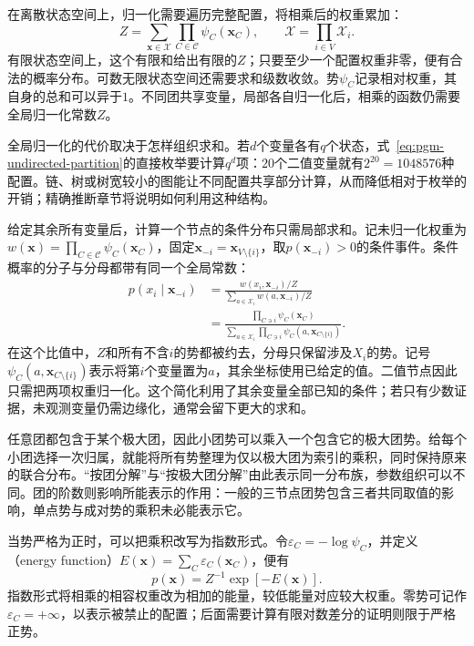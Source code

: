 在离散状态空间上，归一化需要遍历完整配置，将相乘后的权重累加：
\begin{equation}
  Z=\sum_{\bm{x}\in\mathcal{X}}\prod_{C\in\mathcal{C}}\psi_C(\bm{x}_C),
  \qquad
  \mathcal{X}=\prod_{i\in V}\mathcal{X}_i.
  \label{eq:pgm-undirected-partition}
\end{equation}
有限状态空间上，这个有限和给出有限的$Z$；只要至少一个配置权重非零，便有合法的概率分布。可数无限状态空间还需要求和级数收敛。势$\psi_C$记录相对权重，其自身的总和可以异于$1$。不同团共享变量，局部各自归一化后，相乘的函数仍需要全局归一化常数$Z$。

全局归一化的代价取决于怎样组织求和。若$d$个变量各有$q$个状态，式~\eqref{eq:pgm-undirected-partition}的直接枚举要计算$q^d$项：$20$个二值变量就有$2^{20}=1048576$种配置。链、树或树宽较小的图能让不同配置共享部分计算，从而降低相对于枚举的开销；精确推断章节将说明如何利用这种结构。

给定其余所有变量后，计算一个节点的条件分布只需局部求和。记未归一化权重为$w(\bm{x})=\prod_{C\in\mathcal C}\psi_C(\bm{x}_C)$，固定$\bm{x}_{-i}=\bm{x}_{V\setminus\{i\}}$，取$p(\bm{x}_{-i})>0$的条件事件。条件概率的分子与分母都带有同一个全局常数：
\begin{equation}
  \begin{aligned}
    p(x_i\mid\bm{x}_{-i})
      &=\frac{w(x_i,\bm{x}_{-i})/Z}
        {\sum_{a\in\mathcal X_i}w(a,\bm{x}_{-i})/Z}\\
      &=\frac{\prod_{C\ni i}\psi_C(\bm{x}_C)}
        {\sum_{a\in\mathcal X_i}
          \prod_{C\ni i}\psi_C(a,\bm{x}_{C\setminus\{i\}})}.
  \end{aligned}
  \label{eq:pgm-undirected-local-conditional}
\end{equation}
在这个比值中，$Z$和所有不含$i$的势都被约去，分母只保留涉及$X_i$的势。记号$\psi_C(a,\bm{x}_{C\setminus\{i\}})$表示将第$i$个变量置为$a$，其余坐标使用已给定的值。二值节点因此只需把两项权重归一化。这个简化利用了其余变量全部已知的条件；若只有少数证据，未观测变量仍需边缘化，通常会留下更大的求和。

任意团都包含于某个极大团，因此小团势可以乘入一个包含它的极大团势。给每个小团选择一次归属，就能将所有势整理为仅以极大团为索引的乘积，同时保持原来的联合分布。“按团分解”与“按极大团分解”由此表示同一分布族，参数组织可以不同。团的阶数则影响所能表示的作用：一般的三节点团势包含三者共同取值的影响，单点势与成对势的乘积未必能表示它。

当势严格为正时，可以把乘积改写为指数形式。令$\varepsilon_C=-\log\psi_C$，并定义（energy function）$E(\bm{x})=\sum_C\varepsilon_C(\bm{x}_C)$，便有
\[
  p(\bm{x})=Z^{-1}\exp[-E(\bm{x})].
\]
指数形式将相乘的相容权重改为相加的能量，较低能量对应较大权重。零势可记作$\varepsilon_C=+\infty$，以表示被禁止的配置；后面需要计算有限对数差分的证明则限于严格正势。

